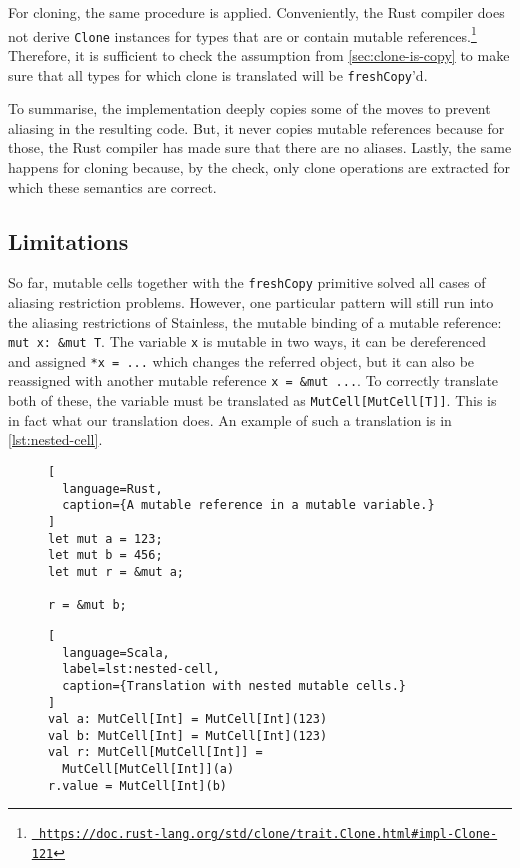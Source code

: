 For cloning, the same procedure is applied. Conveniently, the Rust compiler does
not derive \lstinline!Clone! instances for types that are or contain mutable
references.\footnote{\href{}{\texttt{\color{MidnightBlue}
https://doc.rust-lang.org/std/clone/trait.Clone.html\#impl-Clone-121}}}
Therefore, it is sufficient to check the assumption from
\autoref{sec:clone-is-copy} to make sure that all types for which clone is
translated will be \lstinline!freshCopy!'d.

To summarise, the implementation deeply copies some of the moves to prevent
aliasing in the resulting code. But, it never copies mutable references because
for those, the Rust compiler has made sure that there are no aliases. Lastly,
the same happens for cloning because, by the check, only clone operations are
extracted for which these semantics are correct.


\subsection{Limitations}
\label{trans-limitations}

So far, mutable cells together with the \lstinline!freshCopy! primitive solved
all cases of aliasing restriction problems. However, one particular pattern will
still run into the aliasing restrictions of Stainless, the mutable binding of a
mutable reference: \passthrough{\lstinline!mut x: &mut T!}. The variable
\lstinline!x! is mutable in two ways, it can be dereferenced and assigned
\lstinline!*x = ...! which changes the referred object, but it can also be
reassigned with another mutable reference \lstinline!x = &mut ...!. To correctly
translate both of these, the variable must be translated as
\lstinline!MutCell[MutCell[T]]!. This is in fact what our translation does. An
example of such a translation is in \autoref{lst:nested-cell}.

\begin{figure}
\noindent\begin{minipage}[t]{.35\textwidth}
\begin{lstlisting}[
  language=Rust,
  caption={A mutable reference in a mutable variable.}
]
let mut a = 123;
let mut b = 456;
let mut r = &mut a;

r = &mut b;
\end{lstlisting}
\end{minipage}\hfill
\begin{minipage}[t]{.6\textwidth}
\begin{lstlisting}[
  language=Scala,
  label=lst:nested-cell,
  caption={Translation with nested mutable cells.}
]
val a: MutCell[Int] = MutCell[Int](123)
val b: MutCell[Int] = MutCell[Int](123)
val r: MutCell[MutCell[Int]] =
  MutCell[MutCell[Int]](a)
r.value = MutCell[Int](b)
\end{lstlisting}
\end{minipage}
\end{figure}

